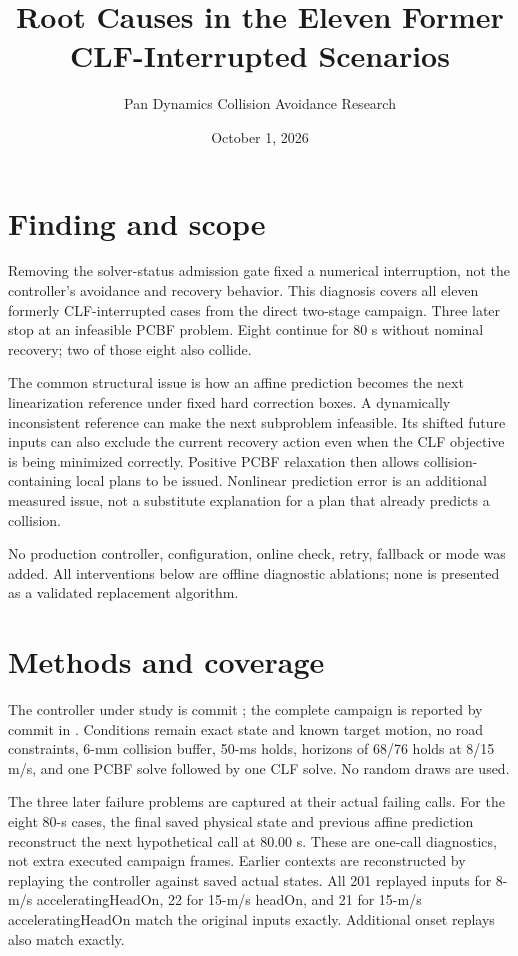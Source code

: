 \documentclass[11pt]{article}
\title{Root Causes in the Eleven Former CLF-Interrupted Scenarios}
\author{Pan Dynamics Collision Avoidance Research}
\date{October 1, 2026}
\begin{document}
\maketitle
\section{Finding and scope}
Removing the solver-status admission gate fixed a numerical interruption,
not the controller's avoidance and recovery behavior. This diagnosis covers
all eleven formerly CLF-interrupted cases from the direct two-stage campaign.
Three later stop at an infeasible PCBF problem. Eight continue for 80 s without
nominal recovery; two of those eight also collide.

The common structural issue is how an affine prediction becomes the next
linearization reference under fixed hard correction boxes. A dynamically
inconsistent reference can make the next subproblem infeasible. Its shifted
future inputs can also exclude the current recovery action even when the
CLF objective is being minimized correctly. Positive PCBF relaxation then
allows collision-containing local plans to be issued. Nonlinear prediction
error is an additional measured issue, not a substitute explanation for a
plan that already predicts a collision.

No production controller, configuration, online check, retry, fallback or
mode was added. All interventions below are offline diagnostic ablations;
none is presented as a validated replacement algorithm.

\section{Methods and coverage}
The controller under study is commit
; the complete campaign is
reported by commit  in
.
Conditions remain exact state and known target motion, no road constraints,
6-mm collision buffer, 50-ms holds, horizons of 68/76 holds at 8/15 m/s,
and one PCBF solve followed by one CLF solve. No random draws are used.

The three later failure problems are captured at their actual failing calls.
For the eight 80-s cases, the final saved physical state and previous affine
prediction reconstruct the next hypothetical call at 80.00 s. These are
one-call diagnostics, not extra executed campaign frames. Earlier contexts
are reconstructed by replaying the controller against saved actual states.
All 201 replayed inputs for 8-m/s acceleratingHeadOn, 22 for 15-m/s headOn,
and 21 for 15-m/s acceleratingHeadOn match the original inputs exactly.
Additional onset replays also match exactly.
\end{document}

